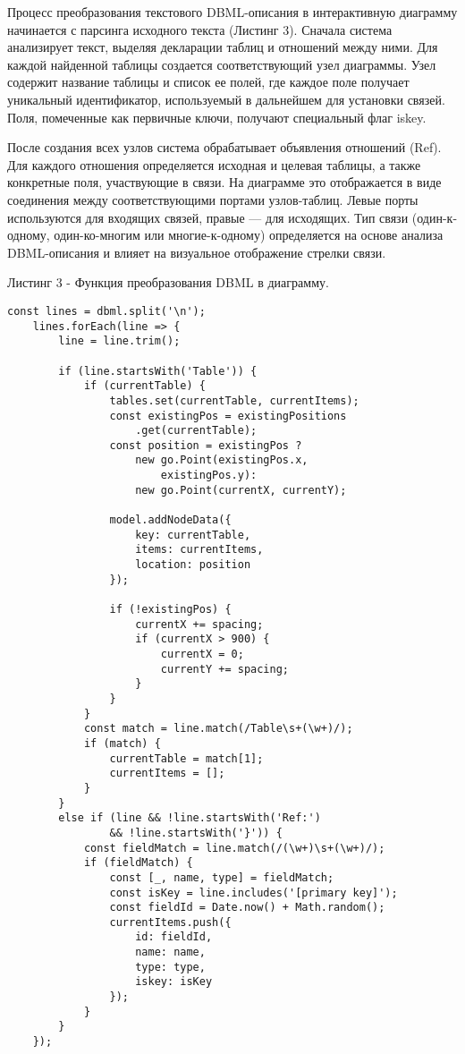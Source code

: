 Процесс преобразования текстового DBML-описания в интерактивную диаграмму начинается с парсинга исходного текста (Листинг 3). Сначала система анализирует текст, выделяя декларации таблиц и отношений между ними. Для каждой найденной таблицы создается соответствующий узел диаграммы. Узел содержит название таблицы и список ее полей, где каждое поле получает уникальный идентификатор, используемый в дальнейшем для установки связей. Поля, помеченные как первичные ключи, получают специальный флаг iskey.

После создания всех узлов система обрабатывает объявления отношений (Ref). Для каждого отношения определяется исходная и целевая таблицы, а также конкретные поля, участвующие в связи. На диаграмме это отображается в виде соединения между соответствующими портами узлов-таблиц. Левые порты используются для входящих связей, правые — для исходящих. Тип связи (один-к-одному, один-ко-многим или многие-к-одному) определяется на основе анализа DBML-описания и влияет на визуальное отображение стрелки связи.

Листинг 3 - Функция преобразования DBML в диаграмму.
\begin{lstlisting}[frame=single]
 const lines = dbml.split('\n');
    lines.forEach(line => {
        line = line.trim();

        if (line.startsWith('Table')) {
            if (currentTable) {
                tables.set(currentTable, currentItems);
                const existingPos = existingPositions
                    .get(currentTable);
                const position = existingPos ?
                    new go.Point(existingPos.x, 
                        existingPos.y):
                    new go.Point(currentX, currentY);

                model.addNodeData({
                    key: currentTable,
                    items: currentItems,
                    location: position
                });

                if (!existingPos) {
                    currentX += spacing;
                    if (currentX > 900) {
                        currentX = 0;
                        currentY += spacing;
                    }
                }
            }
            const match = line.match(/Table\s+(\w+)/);
            if (match) {
                currentTable = match[1];
                currentItems = [];
            }
        }
        else if (line && !line.startsWith('Ref:') 
                && !line.startsWith('}')) {
            const fieldMatch = line.match(/(\w+)\s+(\w+)/);
            if (fieldMatch) {
                const [_, name, type] = fieldMatch;
                const isKey = line.includes('[primary key]');
                const fieldId = Date.now() + Math.random();
                currentItems.push({
                    id: fieldId,
                    name: name,
                    type: type,
                    iskey: isKey
                });
            }
        }
    });
\end{lstlisting}

